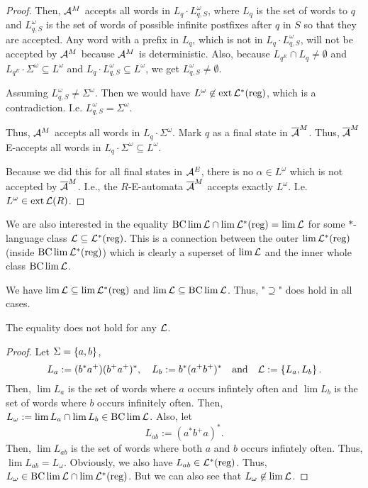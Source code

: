 \begin{lemma}
\begin{proof}
Then, $\mathcal{A}^M$ accepts all words in $L_q \cdot L_{q,S}^\omega$, where $L_q$ is the set of words to $q$ and $L^\omega_{q,S}$ is the set of words of possible infinite postfixes after $q$ in $S$ so that they are accepted.
Any word with a prefix in $L_q$, which is not in $L_q \cdot L^\omega_{q,S}$, will not be accepted by $\mathcal{A}^M$ because $\mathcal{A}^M$ is deterministic. Also, because $L_{q^E} \cap L_q \neq \emptyset$ and $L_{q^E} \cdot \Sigma^\omega \subseteq L^\omega$ and $L_q \cdot L^\omega_{q,S} \subseteq L^\omega$, we get $L^\omega_{q,S} \neq \emptyset$.

Assuming $L^\omega_{q,S} \neq \Sigma^\omega$. Then we would have $L^\omega \not\in \operatorname{ext} \mathcal{L}^*(\text{reg})$, which is a contradiction. I.e. $L^\omega_{q,S} = \Sigma^\omega$.

Thus, $\mathcal{A}^M$ accepts all words in $L_q \cdot \Sigma^\omega$. Mark $q$ as a final state in $\overline{\mathcal{A}}^M$. Thus, $\overline{\mathcal{A}}^M$ E-accepts all words in $L_q \cdot \Sigma^\omega \subseteq L^\omega$.


Because we did this for all final states in $\mathcal{A}^E$, there is no $\alpha \in L^\omega$ which is not accepted by $\overline{\mathcal{A}}^M$. I.e., the $R$-E-automata $\overline{\mathcal{A}}^M$ accepts exactly $L^\omega$. I.e. $L^\omega \in \operatorname{ext} \mathcal{L}(R)$.
\end{proof}
\end{lemma}


We are also interested in the equality $\operatorname{BC} \lim \mathcal{L} \cap \lim \mathcal{L}^*(\text{reg}) = \lim \mathcal{L}$ for some $*$-language class $\mathcal{L} \subseteq \mathcal{L}^*(\text{reg})$. This is a connection between the outer $\lim \mathcal{L}^*(\text{reg})$ (inside $\operatorname{BC} \lim \mathcal{L}^*(\text{reg})$) which is clearly a superset of $\lim \mathcal{L}$ and the inner whole class $\operatorname{BC} \lim \mathcal{L}$.

We have $\lim \mathcal{L} \subseteq \lim \mathcal{L}^*(\text{reg})$ and $\lim \mathcal{L} \subseteq \operatorname{BC} \lim \mathcal{L}$. Thus, "$\supseteq$" does hold in all cases.

\begin{example}
\label{gen:bcLimLReg-and-limL:counter-example}
The equality does not hold for any $\mathcal{L}$.
\begin{proof}
Let $\Sigma = \Set{a,b}$,
\[ L_a := (b^* a^+) (b^+ a^+)^* , \ \ \ L_b := b^* (a^+ b^+)^* \ \ \ \text{and} \ \ \ \Lang := \Set{L_a,L_b} . \]
Then, $\lim L_a$ is the set of words where $a$ occurs infintely often and $\lim L_b$ is the set of words where $b$ occurs infinitely often. Then, $L_\omega := \lim L_a \cap \lim L_b \in \operatorname{BC} \lim \mathcal{L}$. Also, let
\[ L_{ab} := (a^* b^+ a)^* . \]
Then, $\lim L_{ab}$ is the set of words where both $a$ and $b$ occurs infintely often. Thus, $\lim L_{ab} = L_\omega$. Obviously, we also have $L_{ab} \in \mathcal{L}^*(\text{reg})$. Thus, $L_\omega \in \operatorname{BC} \lim \mathcal{L} \cap \lim \mathcal{L}^*(\text{reg})$. But we can also see that $L_\omega \not\in \lim \mathcal{L}$.
\end{proof}
\end{example}

